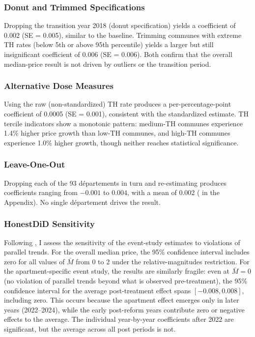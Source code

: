 \documentclass[12pt]{article}
\begin{document}
\subsubsection{Donut and Trimmed Specifications}

Dropping the transition year 2018 (donut specification) yields a coefficient of 0.002 (SE = 0.005), similar to the baseline. Trimming communes with extreme TH rates (below 5th or above 95th percentile) yields a larger but still insignificant coefficient of 0.006 (SE = 0.006). Both confirm that the overall median-price result is not driven by outliers or the transition period.

\subsubsection{Alternative Dose Measures}

Using the raw (non-standardized) TH rate produces a per-percentage-point coefficient of 0.0005 (SE = 0.001), consistent with the standardized estimate. TH tercile indicators show a monotonic pattern: medium-TH communes experience 1.4\% higher price growth than low-TH communes, and high-TH communes experience 1.0\% higher growth, though neither reaches statistical significance.

\subsubsection{Leave-One-Out}

Dropping each of the 93 d\'{e}partements in turn and re-estimating produces coefficients ranging from $-0.001$ to $0.004$, with a mean of 0.002 ( in the Appendix). No single d\'{e}partement drives the result.

\subsubsection{HonestDiD Sensitivity}

Following \citet{rambachan2023more}, I assess the sensitivity of the event-study estimates to violations of parallel trends. For the overall median price, the 95\% confidence interval includes zero for all values of $\bar{M}$ from 0 to 2 under the relative-magnitudes restriction. For the apartment-specific event study, the results are similarly fragile: even at $\bar{M} = 0$ (no violation of parallel trends beyond what is observed pre-treatment), the 95\% confidence interval for the average post-treatment effect spans $[-0.008, 0.008]$, including zero. This occurs because the apartment effect emerges only in later years (2022--2024), while the early post-reform years contribute zero or negative effects to the average. The individual year-by-year coefficients after 2022 are significant, but the average across all post periods is not.
\end{document}
